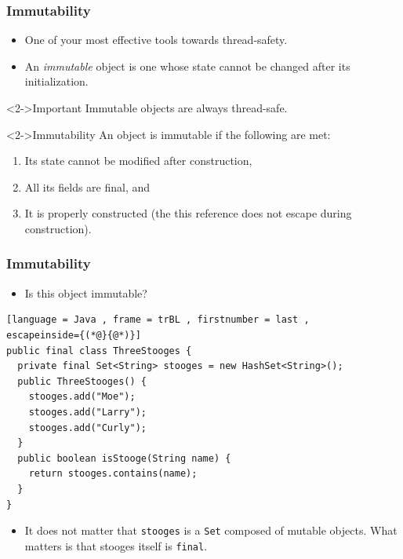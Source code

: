 \documentclass[xcolor={dvipsnames,svgnames},aspectratio=169]{beamer}
\begin{document}
\begin{frame}[fragile]
  \frametitle{Immutability}

  \begin{itemize}
  \item[\faBook]<1-> One of your most effective tools towards thread-safety.
  \item[\faBook]<1-> An \emph{immutable} object is one whose state cannot be
    changed after its initialization.
  \end{itemize}
  \begin{block}<2->{\faBriefcaseMedical\quad Important}
    Immutable objects are always thread-safe.
  \end{block}
  \vspace{0.2cm}
  \begin{block}<2->{\faBook\quad Immutability}
    An object is immutable if the following are met:
    \begin{enumerate}
    \item  Its state cannot be modified after construction,
    \item All its fields are final, and
    \item  It is properly constructed (the this reference does not escape during
      construction).
    \end{enumerate}
  \end{block}


\end{frame}

\begin{frame}[fragile]
  \frametitle{Immutability}

  \begin{itemize}
    \item[\faBook] Is this object immutable?
  \end{itemize}

\begin{lstlisting}[language = Java , frame = trBL , firstnumber = last ,
escapeinside={(*@}{@*)}]
public final class ThreeStooges {
  private final Set<String> stooges = new HashSet<String>();
  public ThreeStooges() {
    stooges.add("Moe");
    stooges.add("Larry");
    stooges.add("Curly");
  }
  public boolean isStooge(String name) {
    return stooges.contains(name);
  }
}
\end{lstlisting}
  \begin{itemize}
  \item[\faBook]<3-> It does not matter that \texttt{stooges} is a \texttt{Set}
    composed of mutable objects. What matters is that stooges itself is \texttt{final}.
  \end{itemize}

\end{frame}
\end{document}
